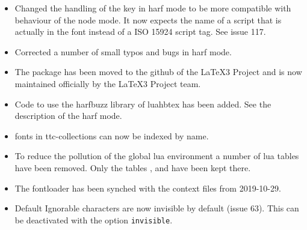 \endsubsection
{}
\begin{itemize}
\item Changed the handling of the  key in harf mode to be more compatible with behaviour of the node mode. It now expects the name of a script that is actually in the font instead of a ISO 15924 script tag. See issue 117.
\item Corrected a number of small typos and bugs in harf mode.
\end{itemize}
\endsubsection
{}
\begin{itemize}
\item   The package has been moved to the github of the LaTeX3 Project and is now maintained
        officially by the LaTeX3 Project team.
\item   Code to use the harfbuzz library of luahbtex has been added. See the description of the harf mode.
\item   fonts in ttc-collections can now be indexed by name.
\item   To reduce the pollution of the global lua environment a number of lua tables have been removed.
        Only the tables ,  and  have been kept there.
\item   The fontloader has been synched with the context files from 2019-10-29.

\end{itemize}
\endsubsection


\begin{itemize}
\item Default Ignorable characters are now invisible by default (issue 63). This can be deactivated with the option \texttt{invisible}.
\end{itemize}
\endsubsection

